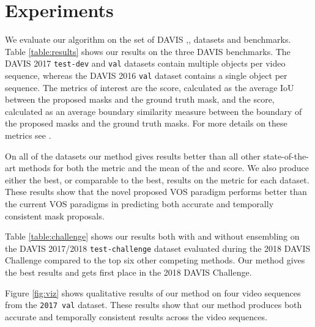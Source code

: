 \documentclass[runningheads]{llncs}
\begin{document}
\section{Experiments}
We evaluate our algorithm on the set of DAVIS \cite{Caelles_arXiv_2018},\cite{Pont-Tuset_arXiv_2017},\cite{Perazzi2016} datasets and benchmarks. Table \ref{table:results} shows our results on the three DAVIS benchmarks. The DAVIS 2017 \texttt{test-dev} and \texttt{val} datasets contain multiple objects per video sequence, whereas the DAVIS 2016 \texttt{val} dataset contains a single object per sequence. The metrics of interest are the  score, calculated as the average IoU between the proposed masks and the ground truth mask, and the  score, calculated as an average boundary similarity measure between the boundary of the proposed masks and the ground truth masks. For more details on these metrics see \cite{Perazzi2016}.

On all of the datasets our method gives results better than all other state-of-the-art methods for both the  metric and the mean of the  and  score. We also produce either the best, or comparable to the best, results on the  metric for each dataset. These results show that the novel proposed VOS paradigm performs better than the current VOS paradigms in predicting both accurate and temporally consistent mask proposals.

Table \ref{table:challenge} shows our results both with and without ensembling on the DAVIS 2017/2018 \texttt{test-challenge} dataset evaluated during the 2018 DAVIS Challenge compared to the top six other competing methods. Our method gives the best results and gets first place in the 2018 DAVIS Challenge. 

Figure \ref{fig:viz} shows qualitative results of our method on four video sequences from the \texttt{2017 val} dataset. These results show that our method produces both accurate and temporally consistent results across the video sequences.
\end{document}
